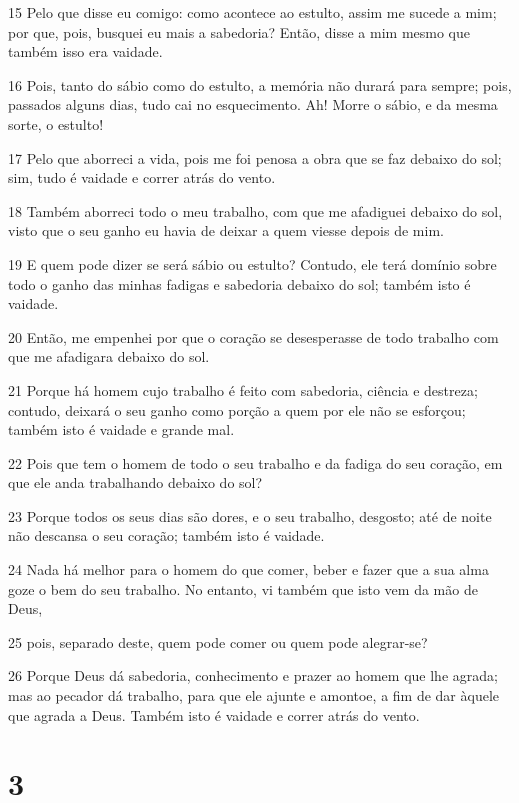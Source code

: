 \par 15 Pelo que disse eu comigo: como acontece ao estulto, assim me sucede a mim; por que, pois, busquei eu mais a sabedoria? Então, disse a mim mesmo que também isso era vaidade.
\par 16 Pois, tanto do sábio como do estulto, a memória não durará para sempre; pois, passados alguns dias, tudo cai no esquecimento. Ah! Morre o sábio, e da mesma sorte, o estulto!
\par 17 Pelo que aborreci a vida, pois me foi penosa a obra que se faz debaixo do sol; sim, tudo é vaidade e correr atrás do vento.
\par 18 Também aborreci todo o meu trabalho, com que me afadiguei debaixo do sol, visto que o seu ganho eu havia de deixar a quem viesse depois de mim.
\par 19 E quem pode dizer se será sábio ou estulto? Contudo, ele terá domínio sobre todo o ganho das minhas fadigas e sabedoria debaixo do sol; também isto é vaidade.
\par 20 Então, me empenhei por que o coração se desesperasse de todo trabalho com que me afadigara debaixo do sol.
\par 21 Porque há homem cujo trabalho é feito com sabedoria, ciência e destreza; contudo, deixará o seu ganho como porção a quem por ele não se esforçou; também isto é vaidade e grande mal.
\par 22 Pois que tem o homem de todo o seu trabalho e da fadiga do seu coração, em que ele anda trabalhando debaixo do sol?
\par 23 Porque todos os seus dias são dores, e o seu trabalho, desgosto; até de noite não descansa o seu coração; também isto é vaidade.
\par 24 Nada há melhor para o homem do que comer, beber e fazer que a sua alma goze o bem do seu trabalho. No entanto, vi também que isto vem da mão de Deus,
\par 25 pois, separado deste, quem pode comer ou quem pode alegrar-se?
\par 26 Porque Deus dá sabedoria, conhecimento e prazer ao homem que lhe agrada; mas ao pecador dá trabalho, para que ele ajunte e amontoe, a fim de dar àquele que agrada a Deus. Também isto é vaidade e correr atrás do vento.

\chapter{3}

